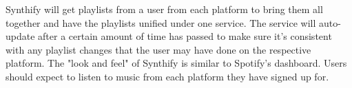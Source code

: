 Synthify will get playlists from a user from each platform to bring them all together and have the playlists unified under one service. The service will auto-update after a certain amount of time has passed to make sure it's consistent with any playlist changes that the user may have done on the respective platform. The "look and feel" of Synthify is similar to Spotify's dashboard. Users should expect to listen to music from each platform they have signed up for.